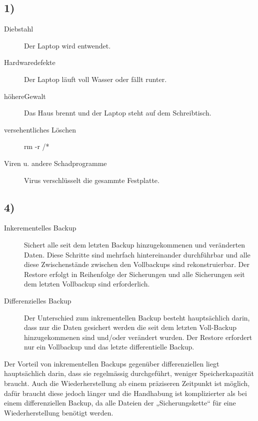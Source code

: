 \documentclass[ngerman]{fbi-aufgabenblatt}
\begin{document}
\setcounter{section}{0}
   


\subsection*{1)}
\begin{description}
	\item[Diebstahl] Der Laptop wird entwendet.
	\item [Hardwaredefekte] Der Laptop läuft voll Wasser oder fällt runter.
	\item [höhereGewalt] Das Haus brennt und der Laptop steht auf dem Schreibtisch.
	\item [versehentliches Löschen] rm -r /*
	\item[Viren u. andere Schadprogramme] Virus verschlüsselt die gesammte Festplatte.
\end{description} 

\subsection*{4)}
\begin{description}
	\item[Inkerementelles Backup] 
	Sichert alle seit dem letzten Backup hinzugekommenen und veränderten Daten.
	Diese Schritte sind mehrfach hintereinander durchführbar und alle diese Zwischenstände zwischen den Vollbackups sind rekonstruierbar. Der Restore erfolgt in Reihenfolge der Sicherungen und alle Sicherungen seit dem letzten Vollbackup sind erforderlich. 
	
	\item [Differenzielles Backup] 
	Der Unterschied zum inkrementellen Backup besteht hauptsächlich darin, dass nur die Daten gesichert werden die seit dem letzten Voll-Backup hinzugekommenen sind und/oder verändert wurden.
	Der Restore erfordert nur ein Vollbackup und das letzte differentielle Backup. 
\end{description} 

Der Vorteil von inkrementellen Backups gegenüber differenziellen liegt hauptsächlich darin, dass sie regelmässig durchgeführt, weniger Speicherkapazität braucht. Auch die Wiederherstellung ab einem präziseren Zeitpunkt ist möglich,  dafür braucht diese jedoch länger und die Handhabung ist komplizierter als bei einem differenziellen Backup, da alle Dateien der „Sicherungskette“ für eine Wiederherstellung benötigt werden.


\end{document}
